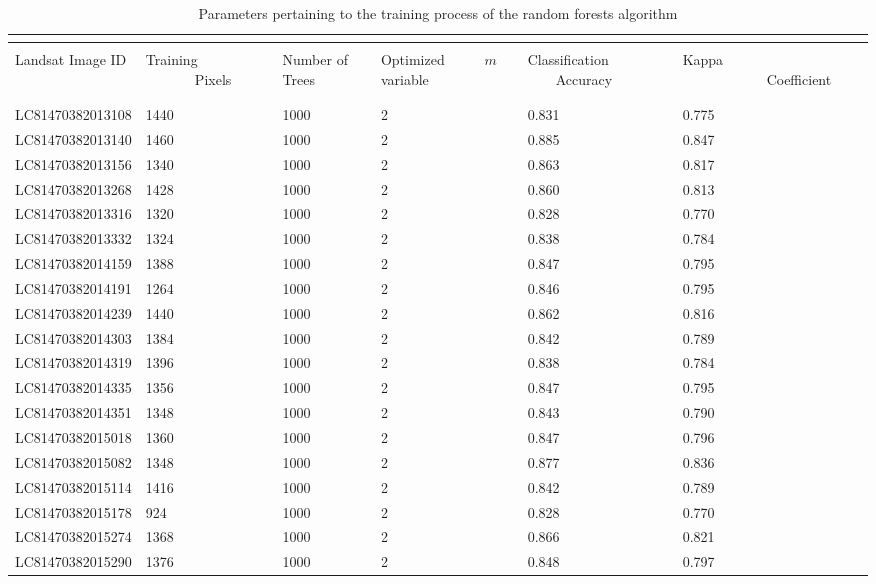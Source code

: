 \begin{ThreePartTable}
	\centering
	\small
	\def\arraystretch{1.3}
	\begin{longtable}{L{3.2cm} L{1.8cm} L{2cm} L{2.2cm} L{2.5cm} L{1.7cm}}
		\caption{Parameters pertaining to the training process of the random forests algorithm}
		\hskip15pt	
		\label{table15}\\
		\toprule[0.25mm]\\[-0.5cm]
		Landsat Image ID & Training ~~~~~~~Pixels & Number of Trees& Optimized  ~~~~~$m$ variable & Classification ~~~~Accuracy & Kappa ~~~~~~~~~~~~Coefficient \\\\[-0.5cm]
		\midrule[0.35mm]\\[-0.4cm]
		LC81470382013108 & 1440 &1000& 2 & 0.831 & 0.775 \\[0.05cm]
		LC81470382013140 & 1460 &1000& 2 & 0.885 &0.847\\[0.05cm]
		LC81470382013156 & 1340 &1000& 2 & 0.863 & 0.817\\[0.05cm]
		LC81470382013268 & 1428 &1000&2&0.860 & 0.813\\[0.05cm]
		LC81470382013316 & 1320 &1000&2&0.828 &0.770\\[0.05cm]
		LC81470382013332 & 1324 &1000&2&0.838 &0.784\\[0.05cm]
		LC81470382014159 & 1388 &1000&2& 0.847&0.795 \\[0.05cm]
		LC81470382014191 & 1264 &1000&2& 0.846&0.795\\[0.05cm]
		LC81470382014239 & 1440 &1000&2&0.862 &0.816 \\[0.05cm]
		LC81470382014303 & 1384 &1000&2& 0.842&0.789\\[0.05cm]
		LC81470382014319 & 1396 &1000&2&0.838 &0.784 \\[0.05cm]
		LC81470382014335 & 1356 &1000&2&0.847 &0.795 \\[0.05cm]
		LC81470382014351 & 1348 &1000&2&0.843 &0.790 \\[0.05cm]
		LC81470382015018 & 1360 &1000&2&0.847 &0.796 \\[0.05cm]
		LC81470382015082 & 1348 &1000&2&0.877 &0.836 \\[0.05cm]
		LC81470382015114 & 1416 &1000&2&0.842 &0.789 \\[0.05cm]
	    LC81470382015178 & 924 &1000&2& 0.828	&0.770 \\[0.05cm]
		LC81470382015274 & 1368 &1000&2&0.866 & 0.821\\[0.05cm]
		LC81470382015290 & 1376 &1000&2&0.848 & 0.797\\[0.05cm]

\end{longtable}
\end{ThreePartTable}
